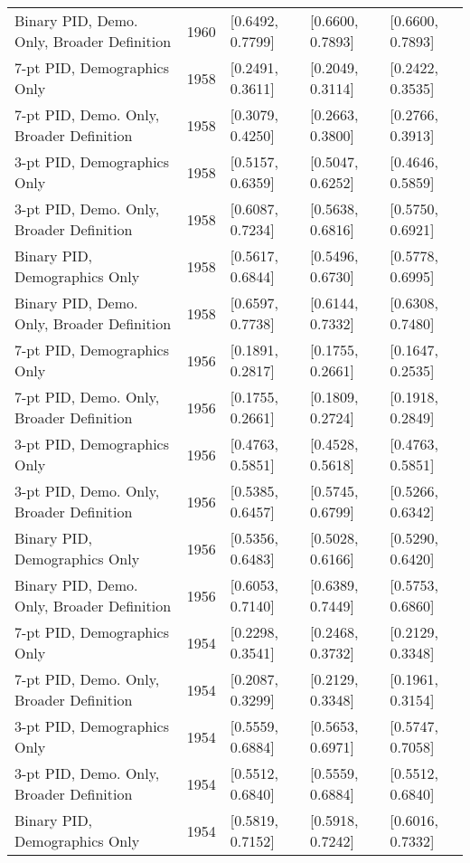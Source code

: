 \begin{longtable}{lrlll}
  Binary PID, Demo. Only, Broader Definition & 1960 & [0.6492, 0.7799] & [0.6600, 0.7893] & [0.6600, 0.7893] \\ 
  7-pt PID, Demographics Only & 1958 & [0.2491, 0.3611] & [0.2049, 0.3114] & [0.2422, 0.3535] \\ 
  7-pt PID, Demo. Only, Broader Definition & 1958 & [0.3079, 0.4250] & [0.2663, 0.3800] & [0.2766, 0.3913] \\ 
  3-pt PID, Demographics Only & 1958 & [0.5157, 0.6359] & [0.5047, 0.6252] & [0.4646, 0.5859] \\ 
  3-pt PID, Demo. Only, Broader Definition & 1958 & [0.6087, 0.7234] & [0.5638, 0.6816] & [0.5750, 0.6921] \\ 
  Binary PID, Demographics Only & 1958 & [0.5617, 0.6844] & [0.5496, 0.6730] & [0.5778, 0.6995] \\ 
  Binary PID, Demo. Only, Broader Definition & 1958 & [0.6597, 0.7738] & [0.6144, 0.7332] & [0.6308, 0.7480] \\ 
  7-pt PID, Demographics Only & 1956 & [0.1891, 0.2817] & [0.1755, 0.2661] & [0.1647, 0.2535] \\ 
  7-pt PID, Demo. Only, Broader Definition & 1956 & [0.1755, 0.2661] & [0.1809, 0.2724] & [0.1918, 0.2849] \\ 
  3-pt PID, Demographics Only & 1956 & [0.4763, 0.5851] & [0.4528, 0.5618] & [0.4763, 0.5851] \\ 
  3-pt PID, Demo. Only, Broader Definition & 1956 & [0.5385, 0.6457] & [0.5745, 0.6799] & [0.5266, 0.6342] \\ 
  Binary PID, Demographics Only & 1956 & [0.5356, 0.6483] & [0.5028, 0.6166] & [0.5290, 0.6420] \\ 
  Binary PID, Demo. Only, Broader Definition & 1956 & [0.6053, 0.7140] & [0.6389, 0.7449] & [0.5753, 0.6860] \\ 
  7-pt PID, Demographics Only & 1954 & [0.2298, 0.3541] & [0.2468, 0.3732] & [0.2129, 0.3348] \\ 
  7-pt PID, Demo. Only, Broader Definition & 1954 & [0.2087, 0.3299] & [0.2129, 0.3348] & [0.1961, 0.3154] \\ 
  3-pt PID, Demographics Only & 1954 & [0.5559, 0.6884] & [0.5653, 0.6971] & [0.5747, 0.7058] \\ 
  3-pt PID, Demo. Only, Broader Definition & 1954 & [0.5512, 0.6840] & [0.5559, 0.6884] & [0.5512, 0.6840] \\ 
  Binary PID, Demographics Only & 1954 & [0.5819, 0.7152] & [0.5918, 0.7242] & [0.6016, 0.7332] \\ 

\end{longtable}
